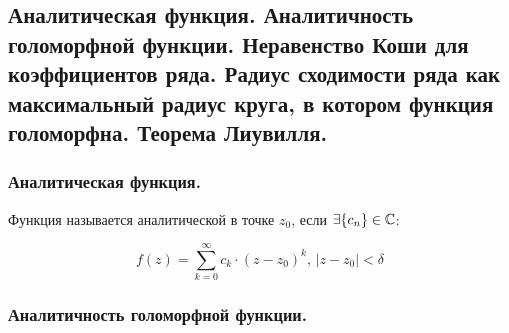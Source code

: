 \subsection{Аналитическая функция. Аналитичность голоморфной функции. Неравенство Коши для коэффициентов ряда. Радиус сходимости ряда как максимальный радиус круга, в котором функция голоморфна. Теорема Лиувилля.}

\subsubsection{Аналитическая функция.}

\begin{definition*}
    Функция называется аналитической в точке $z_0$, если $\exists \{c_n\} \in \mathbb{C}$:

    \[
        f(z) = \sum_{k=0}^{\infty} c_k \cdot (z - z_0)^k \text{, } |z - z_0| < \delta
    \]
\end{definition*}

\subsubsection{Аналитичность голоморфной функции.}

